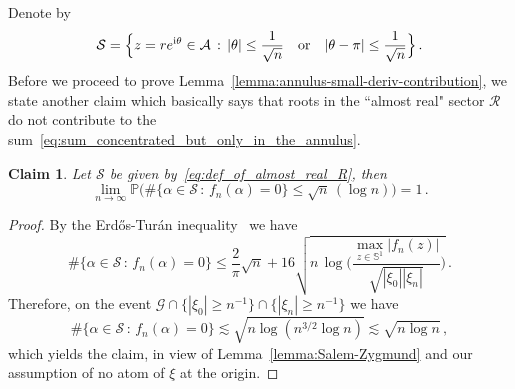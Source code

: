 \documentclass[11pt]{amsart}
\newtheorem{claim}[theorem]{Claim}
\theoremstyle{remark}
\theoremstyle{definition}
\newcommand{\cR}{\mathcal R}
\newcommand{\bP}{\mathbb P}
\newcommand{\bS}{\mathbb S}
\newcommand{\I}{{\rm i}}
\begin{document}
    Denote by 
    \begin{equation}
    \label{eq:def_of_almost_real_R}
      \mathcal{S} = \Big\{ z = re^{\I\theta} \in \mathcal{A}  \, : \, |\theta| \le \frac{1}{\sqrt{n}} \quad \text{or} \quad |\theta-\pi | \le \frac{1}{\sqrt{n}} \Big\} \, .  
    \end{equation}
    Before we proceed to prove Lemma~\ref{lemma:annulus-small-deriv-contribution}, we state another claim which basically says that roots in the ``almost real" sector $\cR$ do not contribute to the sum~\eqref{eq:sum_concentrated_but_only_in_the_annulus}.
    \begin{claim}
        \label{claim:erdos_turan_bound_on_almost_real_roots}
        Let $\mathcal{S}$ be given by~\eqref{eq:def_of_almost_real_R}, then
        \[
        \lim_{n\to\infty} \bP\Big( \# \{\alpha\in \mathcal{S} \, : \, f_n(\alpha)=0 \} \le \sqrt{n} \, (\log n)  \Big) = 1 \, .
        \]
    \end{claim}
    \begin{proof}
        By the Erd\H{o}s-Tur\'an inequality~\cite[Theorem~1]{Erdos-Turan-AOM} we have 
        \[
        \# \{\alpha\in \mathcal{S}\, : \, f_n(\alpha)=0 \} \le \frac{2}{\pi} \sqrt{n} + 16 \sqrt{n \, \log \bigg(\frac{\max_{z\in \bS^1} |f_n(z)|}{\sqrt{|\xi_0| |\xi_n|}}\bigg) } \, .
        \]
        Therefore, on the event $\mathcal{G} \cap \{|\xi_0| \ge n^{-1}\} \cap \{|\xi_n| \ge n^{-1} \}$ we have 
        \[
        \# \{\alpha\in \mathcal{S} \, : \, f_n(\alpha)=0 \} \lesssim \sqrt{n \log(n^{3/2}\log n)} \lesssim \sqrt{n \log n } \, , 
        \]
        which yields the claim, in view of Lemma~\ref{lemma:Salem-Zygmund} and our assumption of no atom of $\xi$ at the origin. 
    \end{proof}
\end{document}
